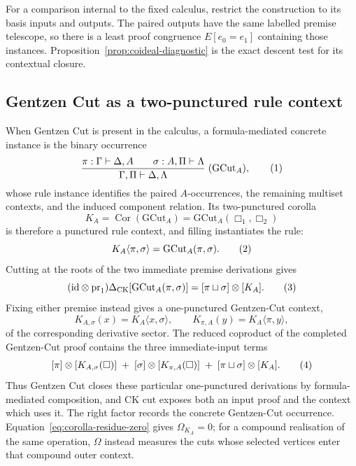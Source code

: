 \documentclass[10pt,a4paper]{article}
\theoremstyle{plain}
\theoremstyle{definition}
\theoremstyle{remark}
\newcommand{\DeltaCK}{\Delta_{\mathrm{CK}}}
\newcommand{\ms}{\mathrel{\vdash}}
\newcommand{\fjoin}{\mathbin{\sqcup}}
\newcommand{\eqtag}{\refstepcounter{equation}\tag{\theequation}}
\begin{document}
For a comparison internal to the fixed calculus, restrict the construction
to its basis
inputs and outputs.  The paired outputs have the same labelled premise telescope, so
there is a least proof congruence \(E[e_0=e_1]\) containing those instances.
Proposition~\ref{prop:coideal-diagnostic} is the exact descent test for its
contextual closure.

\subsection{Gentzen Cut as a two-punctured rule context}

When Gentzen Cut is present in the calculus, a formula-mediated concrete
instance is the binary occurrence
\[
 \frac{\pi:\Gamma\ms\Delta,A\qquad
       \sigma:A,\Pi\ms\Lambda}
      {\Gamma,\Pi\ms\Delta,\Lambda}
      \;(\mathrm{GCut}_A),
\eqtag\label{eq:gentzen-cut-rule}
\]
whose rule instance identifies the paired \(A\)-occurrences, the remaining
multiset contexts, and the induced component relation.  Its two-punctured
corolla
\[
 K_A=\operatorname{Cor}(\mathrm{GCut}_A)
    =\mathrm{GCut}_A(\Box_1,\Box_2)
\]
is therefore a punctured rule context, and filling instantiates the rule:
\[
 K_A\langle\pi,\sigma\rangle
       =\mathrm{GCut}_A(\pi,\sigma).
\eqtag\label{eq:gentzen-cut-filling}
\]
Cutting at the roots of the two immediate premise derivations gives
\[
 (\mathrm{id}\otimes\operatorname{pr}_1)
 \DeltaCK[\mathrm{GCut}_A(\pi,\sigma)]
 =[\pi\fjoin\sigma]\otimes[K_A].
\eqtag\label{eq:gentzen-cut-corolla}
\]
Fixing either premise instead gives a one-punctured Gentzen-Cut context,
\[
 K_{A,\sigma}(x)=K_A\langle x,\sigma\rangle,\qquad
 K_{\pi,A}(y)=K_A\langle\pi,y\rangle ,
\]
of the corresponding derivative sector.  The reduced coproduct of
the completed Gentzen-Cut proof contains the three immediate-input terms
\[
\begin{aligned}
 [\pi]\otimes[K_{A,\sigma}(\Box)]
 \;+\;[\sigma]\otimes[K_{\pi,A}(\Box)]
 \;+\;[\pi\fjoin\sigma]\otimes[K_A].
\end{aligned}
\eqtag\label{eq:gentzen-cut-one-hole-slices}
\]
Thus Gentzen Cut closes these particular one-punctured derivations by
formula-mediated composition, and CK cut exposes both an input proof
and the context which uses it.  The right factor records the concrete
Gentzen-Cut occurrence.  Equation~\eqref{eq:corolla-residue-zero} gives
\(\Omega_{K_A}=0\); for a compound realisation of the same operation,
\(\Omega\) instead measures the cuts whose selected vertices enter that
compound outer context.
\end{document}
